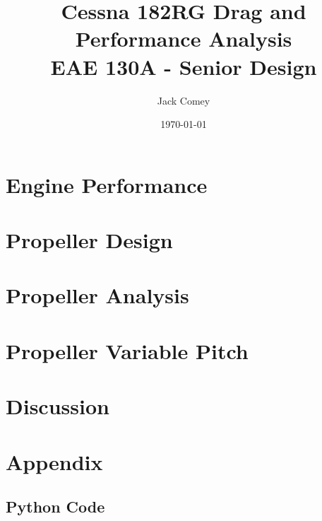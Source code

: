 \documentclass[11pt]{article}
\title{\huge \textbf{Cessna 182RG Drag and Performance Analysis} \\ \vspace{15pt}
\Large EAE 130A - Senior Design\\}
\author{Jack Comey}
\date{\today}
\begin{document}
\maketitle
\newpage

\section{Engine Performance}


\section{Propeller Design}


\section{Propeller Analysis}


\section{Propeller Variable Pitch}


\section{Discussion}


\section{Appendix}

\subsection{Python Code}
\end{document}
